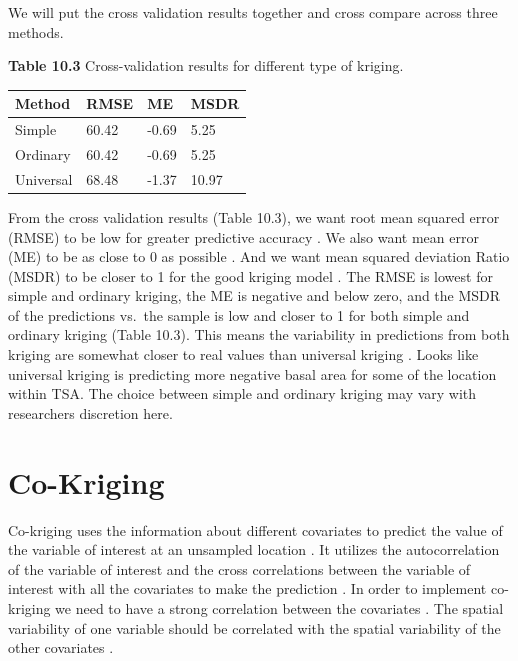 \documentclass[
]{book}
\begin{document}
We will put the cross validation results together and cross compare across three methods.

\textbf{Table 10.3} Cross-validation results for different type of kriging.

\begin{tabular}{l|l|l|l}
\hline
Method & RMSE & ME & MSDR\\
\hline
Simple & 60.42 & -0.69 & 5.25\\
\hline
Ordinary & 60.42 & -0.69 & 5.25\\
\hline
Universal & 68.48 & -1.37 & 10.97\\
\hline
\end{tabular}

From the cross validation results (Table 10.3), we want root mean squared error (RMSE) to be low for greater predictive accuracy \citep{tziachris_spatial_2017}. We also want mean error (ME) to be as close to 0 as possible \citep{tziachris_spatial_2017}. And we want mean squared deviation Ratio (MSDR) to be closer to 1 for the good kriging model \citep{tziachris_spatial_2017}. The RMSE is lowest for simple and ordinary kriging, the ME is negative and below zero, and the MSDR of the predictions vs.~the sample is low and closer to 1 for both simple and ordinary kriging (Table 10.3). This means the variability in predictions from both kriging are somewhat closer to real values than universal kriging \citep{tziachris_spatial_2017}. Looks like universal kriging is predicting more negative basal area for some of the location within TSA. The choice between simple and ordinary kriging may vary with researchers discretion here.

\hypertarget{co-kriging}{%
\section{Co-Kriging}\label{co-kriging}}

Co-kriging uses the information about different covariates to predict the value of the variable of interest at an unsampled location \citep{cressie_statistics_1994}. It utilizes the autocorrelation of the variable of interest and the cross correlations between the variable of interest with all the covariates to make the prediction \citep{cressie_statistics_1994}. In order to implement co-kriging we need to have a strong correlation between the covariates \citep{tziachris_spatial_2017}. The spatial variability of one variable should be correlated with the spatial variability of the other covariates \citep{tziachris_spatial_2017}.
\end{document}
